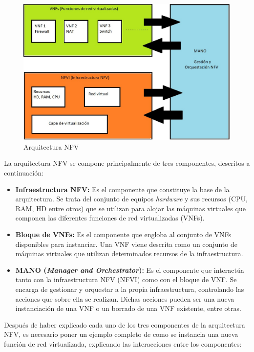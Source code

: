 \begin{figure}[!ht]
	\centering
	\includegraphics[width=0.75\linewidth]{imagenes/arquitectura_nfv}
	\caption{Arquitectura NFV}
	\label{fig:arquitecturanfv}
\end{figure}

La arquitectura \ac{NFV} se compone principalmente de tres componentes, descritos a continuación:

\begin{itemize}
	\item \textbf{Infraestructura \ac{NFV}:} Es el componente que constituye la base de la arquitectura. Se trata del conjunto de equipos \textit{hardware} y sus recursos (CPU, RAM, HD entre otros) que se utilizan para alojar las máquinas virtuales que componen las diferentes funciones de red virtualizadas (\acp{VNF}).
	
	\item \textbf{Bloque de VNFs:} Es el componente que engloba al conjunto de \acp{VNF} disponibles para instanciar. Una \ac{VNF} viene descrita como un conjunto de máquinas virtuales que utilizan determinados recursos de la infraestructura.
	
	\item \textbf{MANO (\textit{Manager and Orchestrator}):} Es el componente que interactúa tanto con la infraestructura \ac{NFV} (\ac{NFVI}) como con el bloque de \ac{VNF}. Se encarga de gestionar y orquestar a la propia infraestructura, controlando las acciones que sobre ella se realizan. Dichas acciones pueden ser una nueva instanciación de una \ac{VNF} o un borrado de una \ac{VNF} existente, entre otras.
	
\end{itemize}

Después de haber explicado cada uno de los tres componentes de la arquitectura \ac{NFV}, es necesario poner un ejemplo completo de como se instancia una nueva función de red virtualizada, explicando las interacciones entre los componentes:

